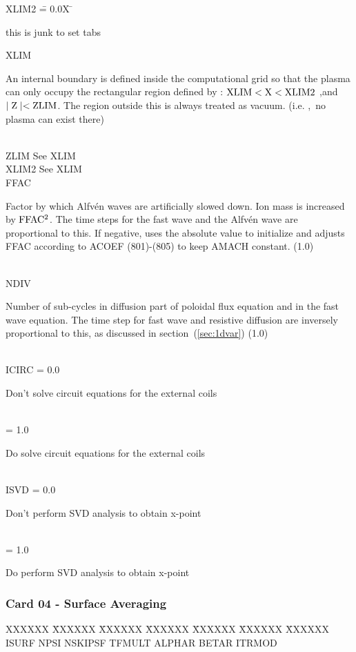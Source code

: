 \begin{tabbing} 
XLIM2 \= = 0.0X \= \parbox[t]{\width}{this is junk to set tabs} \kill 
XLIM \> \> \parbox[t]{\width}{An internal boundary is defined inside the computational grid so 
that the plasma can only occupy the rectangular region defined by : $ \rm XLIM < X < XLIM2
$ ,and $\mid \rm Z \mid < \rm ZLIM$. The region outside this is always treated as vacuum. (i.e. ,\
no plasma can exist there)}\\ 
ZLIM  \>  \>See XLIM\\ 
XLIM2 \>  \>See XLIM\\ 
FFAC \> \> \parbox[t]{\width}{Factor by which Alfv\'en waves are artificially slowed  
down.  Ion mass is increased by $\rm FFAC^2$. The time steps for the fast wave and 
the Alfv\'en wave are proportional to this.  If negative, uses the absolute value 
to initialize and adjusts FFAC according to ACOEF (801)-(805) to keep AMACH constant.
(1.0)}\\ 
NDIV \> \> \parbox[t]{\width}{Number of sub-cycles in diffusion part of poloidal flux 
equation and in the fast wave equation. The time step for fast wave and resistive diffusion 
are inversely proportional to this, as discussed in section~(\ref{sec:1dvar}) (1.0)}\\ 
ICIRC \> = 0.0 \> \parbox[t]{\width}{Don't solve circuit equations for the external coils}\\ 
      \> = 1.0 \> \parbox[t]{\width}{Do solve circuit equations for the external coils}\\ 
ISVD  \> = 0.0 \> \parbox[t]{\width}{Don't perform SVD analysis to obtain x-point}\\ 
      \> = 1.0 \> \parbox[t]{\width}{Do perform SVD analysis to obtain x-point} 
\end{tabbing}
\newpage \subsubsection{Card 04 - Surface Averaging} 
\begin{tabbing} 
XXXXXX \= XXXXXX \= XXXXXX \= XXXXXX \= XXXXXX \= XXXXXX \=
XXXXXX        \\ 
\footnotesize ISURF \>\footnotesize NPSI \>\footnotesize NSKIPSF \>\footnotesize TFMULT
\>\footnotesize  ALPHAR \>\footnotesize BETAR \>\footnotesize ITRMOD 
\end{tabbing}
